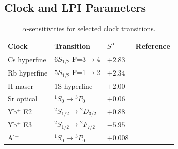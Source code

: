 \subsection{Clock and LPI Parameters}\label{app:clock_notation}

\begin{table}[h]
\centering
\caption{Clock comparison parameters and sensitivities.}
\label{tab:clock_params}
\end{table}

\begin{table}[h!]
\centering
\caption{$\alpha$-sensitivities for selected clock transitions.}
\label{tab:sensitivities}
\begin{tabular}{llll}
\toprule
\textbf{Clock} & \textbf{Transition} & $S^\alpha$ & \textbf{Reference} \\
\midrule
Cs hyperfine & $6S_{1/2}$ F=3$\to$4 & $+2.83$ & \cite{Flambaum2006} \\
Rb hyperfine & $5S_{1/2}$ F=1$\to$2 & $+2.34$ & \cite{Flambaum2006} \\
H maser & 1S hyperfine & $+2.00$ & \cite{Flambaum2006} \\
Sr optical & $^1S_0 \to {}^3P_0$ & $+0.06$ & \cite{Dzuba2018} \\
Yb$^+$ E2 & $^2S_{1/2} \to {}^2D_{3/2}$ & $+0.88$ & \cite{Dzuba2018} \\
Yb$^+$ E3 & $^2S_{1/2} \to {}^2F_{7/2}$ & $-5.95$ & \cite{Dzuba2018} \\
Al$^+$ & $^1S_0 \to {}^3P_0$ & $+0.008$ & \cite{Dzuba2018} \\
\bottomrule
\end{tabular}
\end{table}

